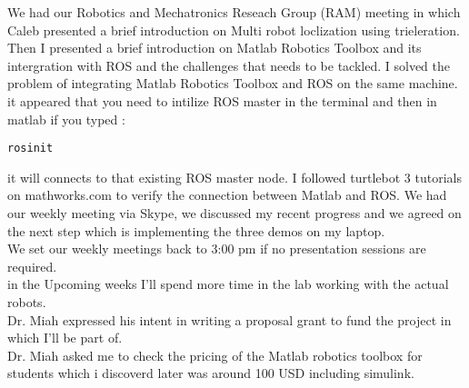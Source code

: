 \documentclass[fontsize=11pt, %
                             paper=letter, %
                             twoside, %
                             captions=tableheading,
                             index=totoc,
                             hyperref]{labbook}
\begin{document}
\begin{addmargin}[0cm]{0cm}
We had our Robotics and Mechatronics Reseach Group (RAM) meeting in which Caleb presented a brief introduction on Multi robot loclization using trieleration. Then I presented a brief introduction on Matlab Robotics Toolbox and its intergration with ROS and the challenges that needs to be tackled. 
I solved the problem of integrating Matlab Robotics Toolbox and ROS on the same machine. it appeared that you need to intilize ROS master in the terminal and then in matlab if you typed  :
\\ \begin{verbatim}
rosinit
\end{verbatim} 
 it will connects to that existing ROS master node. 
 I followed turtlebot 3 tutorials on mathworks.com to verify the connection between Matlab and ROS. 
 We had our weekly meeting via Skype, we discussed my recent progress and we agreed on the next step which is implementing the three demos on my laptop. 
 \\ We set our weekly meetings back to 3:00 pm if no presentation sessions are required. 
 \\ in the Upcoming weeks I'll spend more time in the lab working with the actual robots.
\\Dr. Miah expressed his intent in writing a proposal grant to fund the project in which I'll be part of. 
\\Dr. Miah asked me to check the pricing of the Matlab robotics toolbox for students which i discoverd later was around 100 USD including simulink. 


\end{addmargin}
\end{document}
